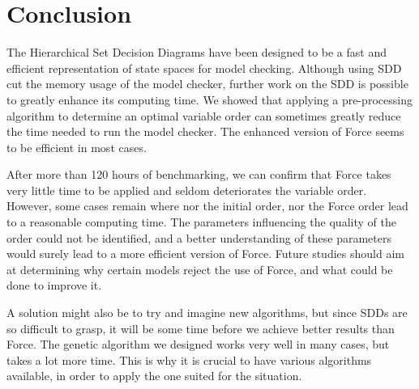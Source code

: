 \documentclass[12pt]{report}
\begin{document}
\newpage
\section*{Conclusion}

The Hierarchical Set Decision Diagrams have been designed to be a fast and efficient representation of state spaces for model checking. Although using SDD cut the memory usage of the model checker, further work on the SDD is possible to greatly enhance its computing time. We showed that applying a pre-processing algorithm to determine an optimal variable order can sometimes greatly reduce the time needed to run the model checker. The enhanced version of Force seems to be efficient in most cases.

After more than 120 hours of benchmarking, we can confirm that Force takes very little time to be applied and seldom deteriorates the variable order. However, some cases remain where nor the initial order, nor the Force order lead to a reasonable computing time. The parameters influencing the quality of the order could not be identified, and a better understanding of these parameters would surely lead to a more efficient version of Force. Future studies should aim at determining why certain models reject the use of Force, and what could be done to improve it.

A solution might also be to try and imagine new algorithms, but since SDDs are so difficult to grasp, it will be some time before we achieve better results than Force. The genetic algorithm we designed works very well in many cases, but takes a lot more time. This is why it is crucial to have various algorithms available, in order to apply the one suited for the situation.

\printbibliography
\end{document}
